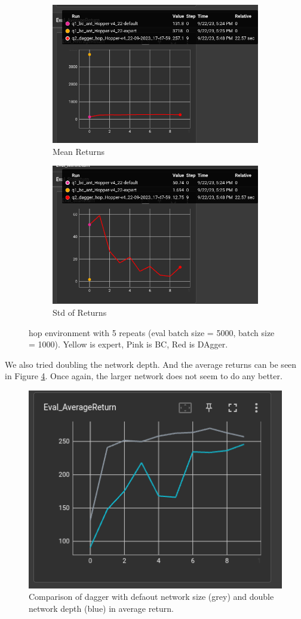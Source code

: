 \documentclass[11pt]{article}
\begin{document}
\begin{figure}[h]
    \centering
    \begin{subfigure}[b]{0.47\textwidth}
        \centering
        \includegraphics[width=\textwidth]{09-22-dag_hop_mean}
        \caption{Mean Returns}
        \label{fig:hop_mean}
    \end{subfigure}
    \hfill
    \begin{subfigure}[b]{0.47\textwidth}
        \centering
        \includegraphics[width=\textwidth]{09-22-dag_hop_std}
        \caption{Std of Returns}
        \label{fig:hop_std}
    \end{subfigure}
    \caption{hop environment with 5 repeats (eval batch size = 5000, batch size = 1000). Yellow is expert, Pink is BC, Red is DAgger.}
    \label{fig:hop_dag}
\end{figure}

We also tried doubling the network depth. And the average returns can be seen in Figure \ref{fig:hop_dag2}.
Once again, the larger network does not seem to do any better.

\begin{figure}[h] 
    \centering
    \includegraphics[width=0.55 \linewidth]{09-22-dag_hop_all}
    \caption{Comparison of dagger with defaout network size (grey) and double network depth (blue) in average return.}
    \label{fig:hop_dag2}
\end{figure}
\end{document}
